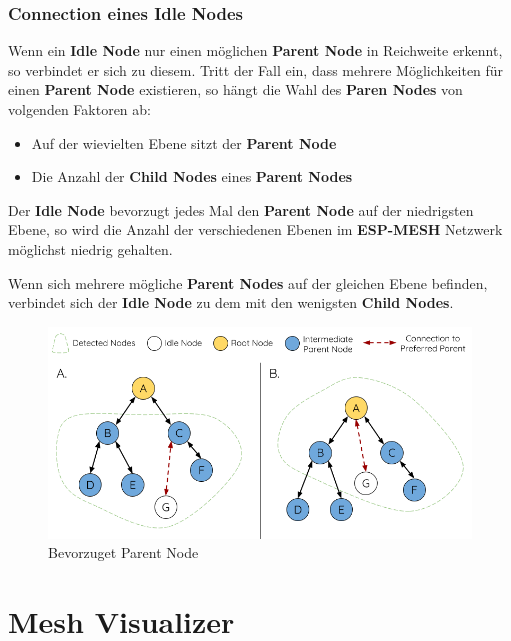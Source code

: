 \subsubsection{Connection eines Idle Nodes}
Wenn ein \textbf{Idle Node} nur einen möglichen \textbf{Parent Node} in Reichweite erkennt, so verbindet er sich zu diesem. Tritt der Fall ein, dass mehrere Möglichkeiten für einen \textbf{Parent Node} existieren, so hängt die Wahl des \textbf{Paren Nodes} von volgenden Faktoren ab:

\begin{itemize}
    \item Auf der wievielten Ebene sitzt der \textbf{Parent Node}
    \item Die Anzahl der \textbf{Child Nodes} eines \textbf{Parent Nodes}
\end{itemize}

Der \textbf{Idle Node} bevorzugt jedes Mal den \textbf{Parent Node} auf der niedrigsten Ebene, so wird die Anzahl der verschiedenen Ebenen im \textbf{ESP-MESH} Netzwerk möglichst niedrig gehalten.

Wenn sich mehrere mögliche \textbf{Parent Nodes} auf der gleichen Ebene befinden, verbindet sich der \textbf{Idle Node} zu dem mit den wenigsten \textbf{Child Nodes}.

\begin{figure}[H] \begin{center}
    \includegraphics[scale=0.5]{diagrams/mesh-preferred-parent-node.png}
    \caption{Bevorzuget Parent Node \cite{esp-mesh}}
    \end{center}    
\end{figure}

\cite{esp-mesh}

\section{Mesh Visualizer}\label{sec:mesh-visualizer}

